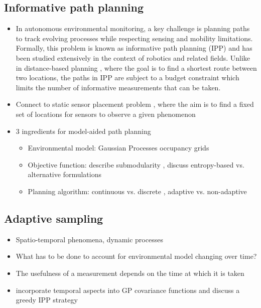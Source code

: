 
\subsection{Informative path planning}
\begin{itemize}

 \item In autonomous environmental monitoring, a key challenge is planning paths to track evolving 
processes while respecting sensing and mobility limitations. Formally, this problem is known as informative 
path planning (IPP) \cite{Singh2009} and has been studied extensively in the context of robotics and related 
fields. Unlike in distance-based planning \cite{Dijkstra1959}, where the goal is to find a shortest 
route between two locations, the paths in IPP are subject to a budget constraint which limits the number of 
informative measurements that can be taken.

 \item Connect to static sensor placement problem \cite{Krause2008}, where the aim is to find a fixed set of 
locations for sensors to observe a given phenomenon

 \item 3 ingredients for model-aided path planning \cite{Detweiler2015}  
   \begin{itemize}
     \item Environmental model: Gaussian Processes \cite{Rasmussen2006, Hitz2015, Binney2013} occupancy grids 
\cite{Elfes1989}
     \item Objective function: describe submodularity \cite{Krause2011}, discuss entropy-based vs. 
alternative \cite{Girdhar2015} formulations
     \item Planning algorithm: continuous \cite{Hitz2015, Hollinger2014, Marchant2014} vs. discrete 
\cite{Binney2013}, adaptive \cite{Hitz2015} vs. non-adaptive
   \end{itemize}
\end{itemize}

\subsection{Adaptive sampling}
\begin{itemize}
 \item Spatio-temporal phenomena, dynamic processes
 \item What has to be done to account for environmental model changing over time?
 \item The usefulness of a measurement depends on the time at which it is taken
 \item \citet{Singh2010} incorporate temporal aspects into GP covariance functions and discuss a greedy IPP 
strategy
\end{itemize}

